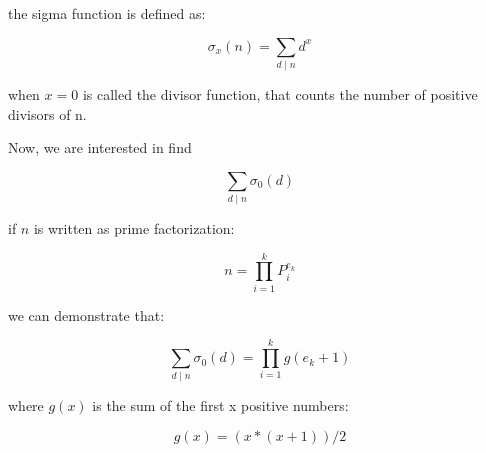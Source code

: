   the sigma function is defined as:

  $$
    \sigma_x(n)=\sum_{d\mid n} d^x
  $$

  when $x = 0$ is called the divisor function, that counts the number
  of positive divisors of n.


  Now, we are interested in find

  $$
    \sum_{d\mid n} \sigma_0(d)
  $$

  if $n$ is written as prime factorization:

  $$
    n = \prod_{i = 1}^{k} P_{i}^{e_k}
  $$

  we can demonstrate that:

  $$
    \sum_{d\mid n} \sigma_0(d) = \prod_{i = 1}^{k} g(e_k + 1)
  $$

  where $g(x)$ is the sum of the first x positive numbers:

  $$
    g(x) = (x * (x + 1)) / 2
  $$
